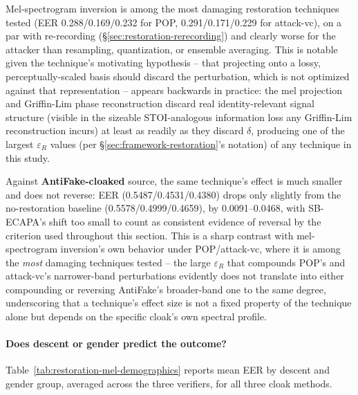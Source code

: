 \documentclass[11pt]{article}
\begin{document}
Mel-spectrogram inversion is among the most damaging restoration
techniques tested (EER 0.288/0.169/0.232 for POP, 0.291/0.171/0.229 for
attack-vc), on a par with re-recording
(\S\ref{sec:restoration-rerecording}) and clearly worse for the
attacker than resampling, quantization, or ensemble averaging. This is
notable given the technique's motivating hypothesis -- that projecting
onto a lossy, perceptually-scaled basis should discard the
perturbation, which is not optimized against that representation --
appears backwards in practice: the mel projection and Griffin-Lim phase
reconstruction discard real identity-relevant signal structure (visible
in the sizeable STOI-analogous information loss any Griffin-Lim
reconstruction incurs) at least as readily as they discard $\delta$,
producing one of the largest $\varepsilon_R$ values (per
\S\ref{sec:framework-restoration}'s notation) of any technique in this
study.

Against \textbf{AntiFake-cloaked} source, the same technique's effect
is much smaller and does not reverse: EER (0.5487/0.4531/0.4380) drops
only slightly from the no-restoration baseline (0.5578/0.4999/0.4659),
by 0.0091--0.0468, with SB-ECAPA's shift too small to count as
consistent evidence of reversal by the criterion used throughout this
section. This is a sharp contrast with mel-spectrogram inversion's own
behavior under POP/attack-vc, where it is among the \emph{most}
damaging techniques tested -- the large $\varepsilon_R$ that compounds
POP's and attack-vc's narrower-band perturbations evidently does not
translate into either compounding or reversing AntiFake's broader-band
one to the same degree, underscoring that a technique's effect size is
not a fixed property of the technique alone but depends on the specific
cloak's own spectral profile.

\paragraph{Does descent or gender predict the outcome?}
Table~\ref{tab:restoration-mel-demographics} reports mean EER by
descent and gender group, averaged across the three verifiers, for all
three cloak methods.
\end{document}
